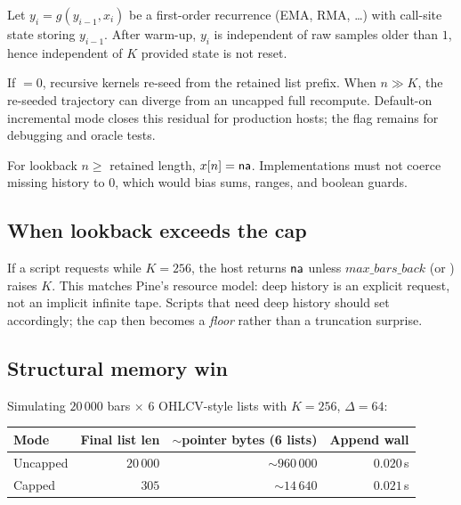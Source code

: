 \documentclass[11pt,a4paper]{article}
\begin{document}
\begin{proposition}
\label{prop:rec-cap}
Let $y_i=g(y_{i-1},x_i)$ be a first-order recurrence (EMA, RMA, \ldots) with
call-site state storing $y_{i-1}$.  After warm-up, $y_i$ is independent of raw
samples older than $1$, hence independent of $K$ provided state is not reset.
\end{proposition}

\begin{remark}
If ${}=0$, recursive kernels re-seed from the
retained list prefix.  When $n\gg K$, the re-seeded trajectory can diverge from
an uncapped full recompute.  Default-on incremental mode closes this residual
for production hosts; the flag remains for debugging and oracle tests.
\end{remark}

\begin{proposition}[OOB is $\na$]
\label{prop:oob-na}
For lookback $n\ge$ retained length, $x[n]=\textsf{na}$.  Implementations must not
coerce missing history to $0$, which would bias sums, ranges, and boolean
guards.
\end{proposition}

\subsection{When lookback exceeds the cap}

If a script requests  while $K=256$, the host returns $\na$
unless $\mathit{max\_bars\_back}$ (or ) raises $K$.
This matches Pine's resource model: deep history is an explicit request, not
an implicit infinite tape.  Scripts that need deep history should set
 accordingly; the cap then becomes a \emph{floor} rather
than a truncation surprise.

\subsection{Structural memory win}

Simulating $20\,000$ bars $\times$ $6$ OHLCV-style lists with $K=256$,
$\Delta=64$:

\begin{center}
\begin{tabular}{lrrr}
\toprule
Mode & Final list len & $\sim$pointer bytes (6 lists) & Append wall \\
\midrule
Uncapped & $20\,000$ & $\sim 960\,000$ & $0.020$\,s \\
Capped   & $305$     & $\sim 14\,640$  & $0.021$\,s \\
\bottomrule
\end{tabular}
\end{center}
\end{document}
